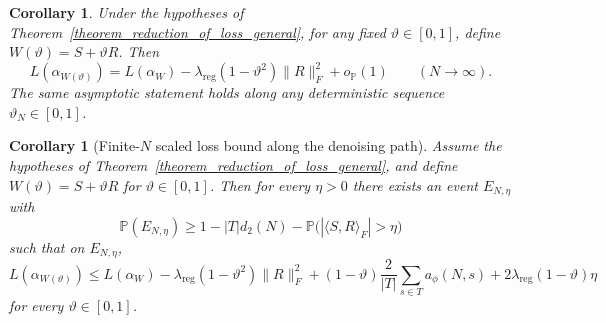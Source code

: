 \documentclass[11pt]{article}
\theoremstyle{plain}
\newtheorem{cor}[thm]{Corollary}
\theoremstyle{definition}
\theoremstyle{remark}
\newcommand{\PP}{\mathbb{P}}
\newcommand{\1}{\mathbf{1}}
\begin{document}
\begin{cor}
\label{cor:scaled_reduction_of_loss_general}
Under the hypotheses of Theorem~\ref{theorem_reduction_of_loss_general}, for any fixed \(\vartheta\in[0,1]\), define \(W(\vartheta)=S+\vartheta R\). Then
\[
L(\alpha_{W(\vartheta)})
=
L(\alpha_W)-\lambda_{\mathrm{reg}}(1-\vartheta^2)\|R\|_F^2+o_{\PP}(1)
\qquad(N\to\infty).
\]
The same asymptotic statement holds along any deterministic sequence \(\vartheta_N\in[0,1]\).
\end{cor}

\begin{cor}[Finite-\(N\) scaled loss bound along the denoising path]
\label{cor:scaled_reduction_of_loss_general_finiteN}
Assume the hypotheses of Theorem~\ref{theorem_reduction_of_loss_general}, and define \(W(\vartheta)=S+\vartheta R\) for \(\vartheta\in[0,1]\). Then for every \(\eta>0\) there exists an event \(E_{N,\eta}\) with
\[
\PP(E_{N,\eta})\ge 1-|T|d_2(N)-\PP\!\big(|\langle S,R\rangle_F|>\eta\big)
\]
such that on \(E_{N,\eta}\),
\[
L(\alpha_{W(\vartheta)})
\le
L(\alpha_W)
-\lambda_{\mathrm{reg}}(1-\vartheta^2)\|R\|_F^2
+(1-\vartheta)\frac{2}{|T|}\sum_{s\in T}a_\phi(N,s)
+2\lambda_{\mathrm{reg}}(1-\vartheta)\eta
\]
for every \(\vartheta\in[0,1]\).
\end{cor}
\end{document}
